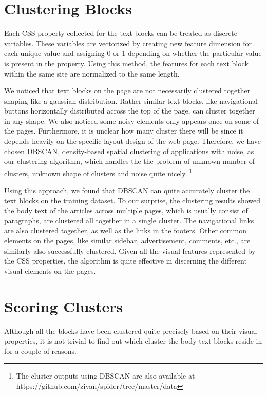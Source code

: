 \documentclass{acm_proc_article-sp}
\begin{document}
\section{Clustering Blocks}

Each CSS property collected for the text blocks can be treated as discrete variables. These variables are vectorized by creating new feature dimension for each unique value and assigning 0 or 1 depending on whether the particular value is present in the property. Using this method, the features for each text block within the same site are normalized to the same length.

We noticed that text blocks on the page are not necessarily clustered together shaping like a gaussian distribution. Rather similar text blocks, like navigational buttons horizontally distributed across the top of the page, can cluster together in any shape. We also noticed some noisy elements only appears once on some of the pages. Furthermore, it is unclear how many cluster there will be since it depends heavily on the specific layout design of the web page. Therefore, we have chosen DBSCAN\cite{ester:dbscan}, density-based spatial clustering of applications with noise, as our clustering algorithm, which handles the the problem of unknown number of clusters, unknown shape of clusters and noise quite nicely..\footnote{The cluster outputs using DBSCAN are also available at https://github.com/ziyan/spider/tree/master/data}

Using this approach, we found that DBSCAN can quite accurately cluster the text blocks on the training dataset. To our surprise, the clustering results showed the body text of the articles across multiple pages, which is usually consist of paragraphs, are clustered all together in a single cluster. The navigational links are also clustered together, as well as the links in the footers. Other common elements on the pages, like similar sidebar, advertisement, comments, etc., are similarly also successfully clustered. Given all the visual features represented by the CSS properties, the algorithm is quite effective in discerning the different visual elements on the pages.

\section{Scoring Clusters}
Although all the blocks have been clustered quite precisely based on their visual properties, it is not trivial to find out which cluster the body text blocks reside in for a couple of reasons.
\end{document}
